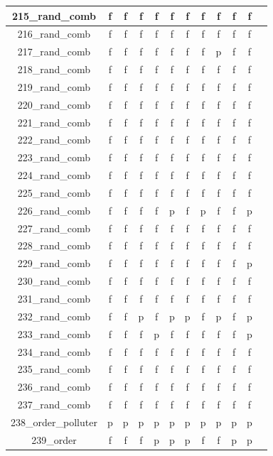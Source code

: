 \documentclass[
fancyheadings, %
%
%
]{stsreprt}
\begin{document}
\begin{longtable}{|c|c|c|c|c|c|c|c|c|c|c|c|}
\hline
215\_rand\_comb  & f & f & f & f & f & f & f & f & f & f \\
\hline
216\_rand\_comb  & f & f & f & f & f & f & f & f & f & f \\
\hline
217\_rand\_comb & f & f & f & f & f & f & f & p & f & f \\
\hline
218\_rand\_comb  & f & f & f & f & f & f & f & f & f & f \\
\hline
219\_rand\_comb  & f & f & f & f & f & f & f & f & f & f \\
\hline
220\_rand\_comb  & f & f & f & f & f & f & f & f & f & f \\
\hline
221\_rand\_comb  & f & f & f & f & f & f & f & f & f & f \\
\hline
222\_rand\_comb  & f & f & f & f & f & f & f & f & f & f \\
\hline
223\_rand\_comb  & f & f & f & f & f & f & f & f & f & f \\
\hline
224\_rand\_comb  & f & f & f & f & f & f & f & f & f & f \\
\hline
225\_rand\_comb  & f & f & f & f & f & f & f & f & f & f \\
\hline
226\_rand\_comb & f & f & f & f & p & f & p & f & f & p \\
\hline
227\_rand\_comb  & f & f & f & f & f & f & f & f & f & f \\
\hline
228\_rand\_comb  & f & f & f & f & f & f & f & f & f & f \\
\hline
229\_rand\_comb & f & f & f & f & f & f & f & f & f & p \\
\hline
230\_rand\_comb  & f & f & f & f & f & f & f & f & f & f \\
\hline
231\_rand\_comb  & f & f & f & f & f & f & f & f & f & f \\
\hline
232\_rand\_comb & f & f & p & f & p & p & f & p & f & p \\
\hline
233\_rand\_comb & f & f & f & p & f & f & f & f & f & p \\
\hline
234\_rand\_comb  & f & f & f & f & f & f & f & f & f & f \\
\hline
235\_rand\_comb  & f & f & f & f & f & f & f & f & f & f \\
\hline
236\_rand\_comb  & f & f & f & f & f & f & f & f & f & f \\
\hline
237\_rand\_comb  & f & f & f & f & f & f & f & f & f & f \\
\hline
238\_order\_polluter & p & p & p & p & p & p & p & p & p & p \\
\hline
239\_order & f & f & f & p & p & p & f & f & p & p \\

\end{longtable}
\end{document}
